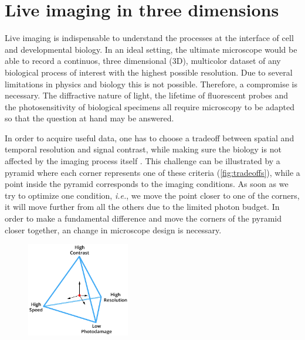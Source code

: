 

\chapter{Live imaging in three dimensions}
\label{ch:intro}

\graphicspath{{./figures/1_spim/}}


Live imaging is indispensable to understand the processes at the interface of cell and developmental biology. In an ideal setting, the ultimate microscope would be able to record a continuos, three dimensional (3D), multicolor dataset of any biological process of interest with the highest possible resolution. Due to several limitations in physics and biology this is not possible. Therefore, a compromise is necessary. The diffractive nature of light, the lifetime of fluorescent probes and the photosensitivity of biological specimens all require microscopy to be adapted so that the question at hand may be answered.

In order to acquire useful data, one has to choose a tradeoff between spatial and temporal resolution and signal contrast, while making sure the biology is not affected by the imaging process itself \cite{laissue_assessing_2017}. This challenge can be illustrated by a pyramid where each corner represents one of these criteria (\autoref{fig:tradeoffs}), while a point inside the pyramid corresponds to the imaging conditions. As soon as we try to optimize one condition, \textit{i.e.}, we move the point closer to one of the corners, it will move further from all the others due to the limited photon budget. In order to make a fundamental difference and move the corners of the pyramid closer together, an change in microscope design is necessary.

\begin{figure}[bht]
  \centering
  \includegraphics[width=0.4\textwidth]{tradeoffs}
  \label{fig:tradeoffs}
\end{figure}


